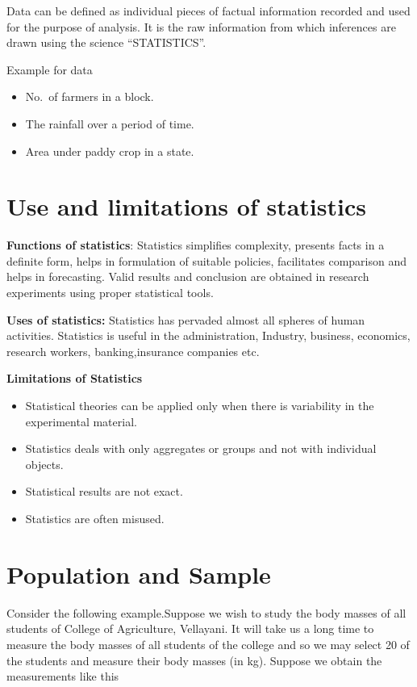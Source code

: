 \documentclass[
]{book}
\begin{document}
Data can be defined as individual pieces of factual information recorded and used for the purpose of analysis. It is the raw information from which inferences are drawn using the science ``STATISTICS''.

Example for data

\begin{itemize}
\item
  No.~of farmers in a block.
\item
  The rainfall over a period of time.
\item
  Area under paddy crop in a state.
\end{itemize}

\hypertarget{use-and-limitations-of-statistics}{%
\section{Use and limitations of statistics}\label{use-and-limitations-of-statistics}}

\textbf{Functions of statistics}: Statistics simplifies complexity, presents facts in a definite form, helps in formulation of suitable policies, facilitates comparison and helps in forecasting. Valid results and conclusion are obtained in research experiments using proper statistical tools.

\textbf{Uses of statistics:} Statistics has pervaded almost all spheres of human activities. Statistics is useful in the administration, Industry, business, economics, research workers, banking,insurance companies etc.

\textbf{Limitations of Statistics}

\begin{itemize}
\item
  Statistical theories can be applied only when there is variability in the experimental material.
\item
  Statistics deals with only aggregates or groups and not with individual objects.
\item
  Statistical results are not exact.
\item
  Statistics are often misused.
\end{itemize}

\hypertarget{population-and-sample}{%
\section{Population and Sample}\label{population-and-sample}}

Consider the following example.Suppose we wish to study the body masses of all students of College of Agriculture, Vellayani. It will take us a long time to measure the body masses of all students of the college and so we may select 20 of the students and measure their body masses (in kg). Suppose we obtain the measurements like this
\end{document}

